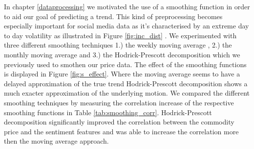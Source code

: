 In chapter \ref{dataprocessing} we motivated the use of a smoothing function in order to aid our goal of predicting a trend. This kind of preprocessing becomes especially important for social media data as it's characterised by an extreme day to day volatility as illustrated in Figure \ref{fig:inc_dist} . We experimented with three different smoothing techniques 1.) the weekly moving average , 2.) the monthly moving average and 3.) the Hodrick-Prescott decomposition which we previously used to smothen our price data. The effect of the smoothing functions is displayed in Figure \ref{fig:s_effect}. Where the moving average seems to have a delayed approximation of the true trend  Hodrick-Prescott decomposition shows a much exacter approximation of the underlying motion. We compared the different smoothing techniques by measuring the correlation increase of the respective smoothing functions in Table \ref{tab:smoothing_corr}. Hodrick-Prescott decomposition significantly improved the correlation between the commodity price and the sentiment features and was able to increase the correlation more then the moving average approach. 



